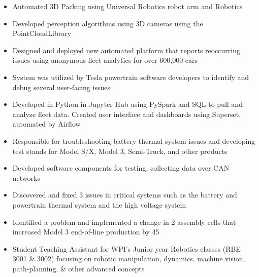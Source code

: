 {}
    \begin{itemize}
        \item Automated 3D Packing using Universal Robotics robot arm and Robotics
        \item Developed perception algorithms using 3D cameras using the PointCloudLibrary
    \end{itemize}
\smallskip
{}
    \begin{itemize}
        \item Designed and deployed new automated platform that reports reoccurring issues using anonymous fleet analytics for over 600,000 cars
        \item System was utilized by Tesla powertrain software developers to identify and debug several user-facing issues
        \item Developed in Python in Jupyter Hub using PySpark and SQL to pull and analyze fleet data. Created user interface and dashboards using Superset, automated by Airflow
    \end{itemize}
    \begin{itemize}
        \item Responsible for troubleshooting battery thermal system issues and developing test stands for Model S/X, Model 3, Semi-Truck, and other products
        \item Developed software components for testing, collecting data over CAN networks
        \item Discovered and fixed 3 issues in critical systems such as the battery and powertrain thermal system and the high voltage system
        \item Identified a problem and implemented a change in 2 assembly cells that increased Model 3 end-of-line production by 45
    \end{itemize}
\smallskip
{}
    \begin{itemize}
        \item Student Teaching Assistant for WPI’s Junior year Robotics classes (RBE 3001 \& 3002) focusing on robotic manipulation, dynamics, machine vision, path-planning, \& other advanced concepts
    \end{itemize}